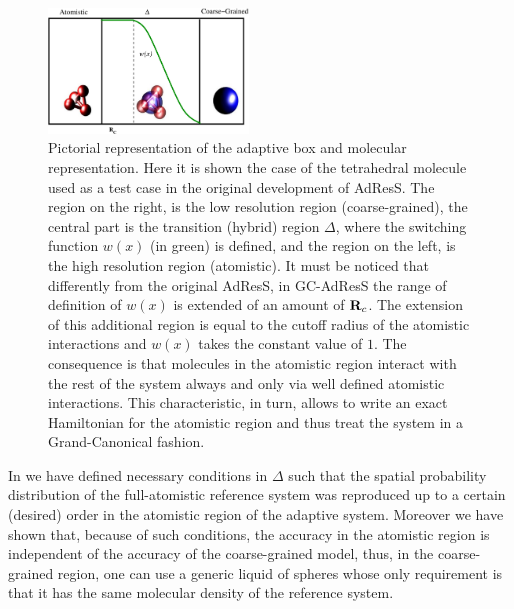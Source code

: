 \documentclass[a4paper,preprint,unsortedaddress]{revtex4-1}
\begin{document}
\begin{figure}
\center
\includegraphics[width=0.475\textwidth]{adapt-schem.eps}
\caption{Pictorial representation of the adaptive box and
molecular representation. Here it is shown the case of the tetrahedral molecule used as a test case in the original development of AdResS. The region on the right,
is the low resolution region (coarse-grained), the central part is
the transition (hybrid) region $\Delta$, where the switching function
$w(x)$ (in green) is defined, and the region on the left, is the high resolution region (atomistic). It must be noticed that differently from the original AdResS, in GC-AdResS the range of definition of $w(x)$ is extended of an amount of ${\bf R}_{c}$. The extension of this additional region is equal to the cutoff radius of the atomistic interactions and $w(x)$ takes the constant value of $1$. The consequence is that molecules in the atomistic region interact with the rest of the system always and only via well defined atomistic interactions. This characteristic, in turn, allows to write an exact Hamiltonian for the atomistic region and thus treat the system in a Grand-Canonical fashion.\label{fig1}}
\end{figure} 
In \cite{prx} we have defined necessary conditions in $\Delta$ such that the spatial probability distribution of the full-atomistic reference system was reproduced up to a certain (desired) order in the atomistic region of the adaptive system. Moreover we have shown that, because of such conditions, the accuracy in the atomistic region is independent of the accuracy of the coarse-grained model, thus, in the coarse-grained region, one can use a generic liquid of spheres whose only requirement is that it has the same molecular density of the reference system.
\end{document}
